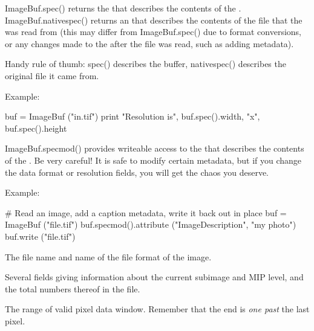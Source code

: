 {\cf ImageBuf.spec()} returns the \ImageSpec that describes the contents of
the \ImageBuf.  {\cf ImageBuf.nativespec()} returns an \ImageSpec that
describes the contents of the file that the \ImageBuf was read from (this
may differ from {\cf ImageBuf.spec()} due to format conversions, or any
changes made to the \ImageBuf after the file was read, such as adding
metadata).

Handy rule of thumb: {\cf spec()} describes the buffer, {\cf nativespec()}
describes the original file it came from.

\noindent Example:
\begin{code}
    buf = ImageBuf ("in.tif")
    print "Resolution is", buf.spec().width, "x", buf.spec().height
\end{code}
\apiend

{\cf ImageBuf.specmod()} provides writeable access to the \ImageSpec that
describes the contents of the \ImageBuf.  Be very careful!  It is safe
to modify certain metadata, but if you change the data format or resolution
fields, you will get the chaos you deserve.

\noindent Example:
\begin{code}
    # Read an image, add a caption metadata, write it back out in place
    buf = ImageBuf ("file.tif")
    buf.specmod().attribute ("ImageDescription", "my photo")
    buf.write ("file.tif")
\end{code}
\apiend

The file name and name of the file format of the image.
\apiend

Several fields giving information about the current subimage and MIP
level, and the total numbers thereof in the file.
\apiend

The range of valid pixel data window. Remember that the {\cf end} is 
\emph{one past} the last pixel.
\apiend

